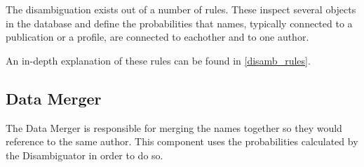 The disambiguation exists out of a number of rules. These inspect several objects in the database and define the probabilities that names, typically connected to a publication or a profile, are connected to eachother and to one author. %

An in-depth explanation of these rules can be found in \ref{disamb_rules}.

\subsection{Data Merger}

The Data Merger is responsible for merging the names together so they would reference to the same author. This component uses the probabilities calculated by the Disambiguator in order to do so.

%
%
%
%
%
%
%
%
%
%
%
